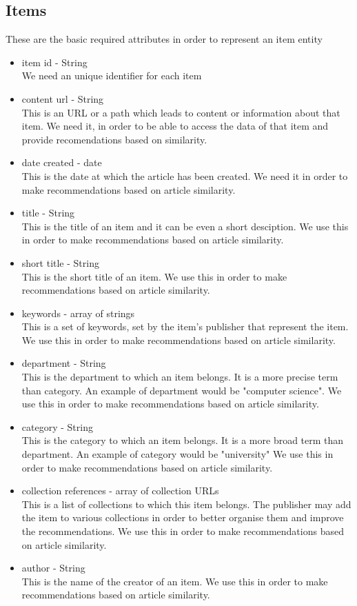 \subsection{Items}
\label{sec:items}
These are the basic required attributes in order to represent an item entity
\begin{itemize}
	\item item id - String
		\\ We need an unique identifier for each item
	\item content url - String
		\\ This is an URL or a path which leads to content or information about that item.
		We need it, in order to be able to access the data of that item and provide recomendations based on similarity. 
	\item date created - date
		\\ This is the date at which the article has been created.
		We need it in order to make recommendations based on article similarity.
	\item title - String
		\\ This is the title of an item and it can be even a short desciption.
		We use this in order to make recommendations based on article similarity.
	\item short title - String
		\\ This is the short title of an item.
		We use this in order to make recommendations based on article similarity.
	\item keywords - array of strings
		\\ This is a set of keywords, set by the item's publisher that represent the item.
		We use this in order to make recommendations based on article similarity.
	\item department - String
		\\ This is the department to which an item belongs. It is a more precise term than category. An example of department would be "computer science".
		We use this in order to make recommendations based on article similarity.
	\item category - String
		\\ This is the category to which an  item belongs. It is a more broad term than department. An example of category would be "university"
		We use this in order to make recommendations based on article similarity.
	\item collection references - array of collection URLs
		\\ This is a list of collections to which this item belongs. The publisher may add the item to various collections in order to better organise them and improve the recommendations.
		We use this in order to make recommendations based on article similarity.
	\item author - String
		\\ This is the name of the creator of an item.
		We use this in order to make recommendations based on article similarity.
\end{itemize}

